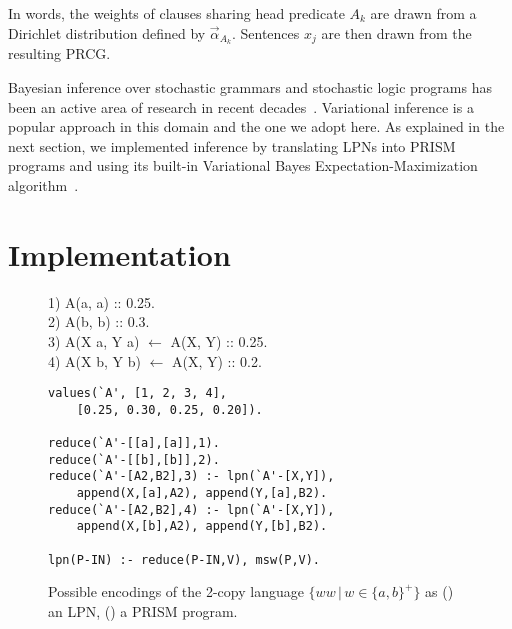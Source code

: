 \documentclass[10pt, twocolumn]{article}
\begin{document}
In words, the weights of clauses sharing head predicate $A_k$ are
drawn from a Dirichlet distribution defined by
$\vec{\alpha}_{A_k}$. Sentences $x_j$ are then drawn from the
resulting PRCG.

Bayesian inference over stochastic grammars
and stochastic logic programs has been an active area of
research in recent decades~\cite{DBLP:journals/etai/Muggleton00, cussens2001parameter, DBLP:conf/emnlp/LiangPJK07,
  goldwater2006contextual, johnson2006adaptor}.
Variational inference is a popular approach in this domain and the one
we adopt here. As explained in the next section, we implemented
inference by translating LPNs into PRISM programs and using its
built-in Variational Bayes Expectation-Maximization
algorithm~\cite{sato2008variational}. 

\vspace{-1em}
\section{Implementation \label{sec:implementation}}


\begin{figure}[t]
	\centering
	\begin{minipage}[b]{0.8\linewidth}
1) A(a, a) :: 0.25. \\
2) A(b, b) :: 0.3. \\
3) A(X a, Y a) $\leftarrow$ A(X, Y) :: 0.25. \\
4) A(X b, Y b) $\leftarrow$ A(X, Y) :: 0.2.
		\subcaption{}
		\label{fig:grammar}
	\end{minipage}
	\begin{minipage}[b]{0.8\linewidth}
        \fontsize{9}{10.5}\selectfont\ttfamily
		\begin{verbatim}
values(`A', [1, 2, 3, 4],
    [0.25, 0.30, 0.25, 0.20]).

reduce(`A'-[[a],[a]],1).
reduce(`A'-[[b],[b]],2).
reduce(`A'-[A2,B2],3) :- lpn(`A'-[X,Y]),
    append(X,[a],A2), append(Y,[a],B2).
reduce(`A'-[A2,B2],4) :- lpn(`A'-[X,Y]),
    append(X,[b],A2), append(Y,[b],B2).

lpn(P-IN) :- reduce(P-IN,V), msw(P,V).
		\end{verbatim}
		\subcaption{}
		\label{fig:prism}
	\end{minipage}
	\caption{Possible encodings of the 2-copy language $\{ww\,|\, w \in \{a,b\}^+\}$ as () an LPN, () a PRISM program.}
	\label{fig:copy}
\end{figure}
\end{document}
